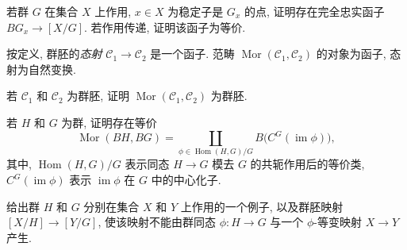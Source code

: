 \begin{exercise}[简单, 适于练习]\label{src:1.4.13}
若群 $G$ 在集合 $X$ 上作用, $x\in X$ 为稳定子是 $G_x$ 的点, 证明存在完全忠实函子 $BG_x\to[X/G]$. 若作用传递, 证明该函子为等价.
\end{exercise}
按定义, 群胚的\textit{态射} $\mathcal C_1\to\mathcal C_2$ 是一个函子. 范畴 $\operatorname{Mor}(\mathcal C_1,\mathcal C_2)$ 的对象为函子, 态射为自然变换.
\begin{exercise}[简单]\label{src:1.4.14}
若 $\mathcal C_1$ 和 $\mathcal C_2$ 为群胚, 证明 $\operatorname{Mor}(\mathcal C_1,\mathcal C_2)$ 为群胚.
\end{exercise}
\begin{exercise}[中等, 适于练习]\label{src:1.4.15}
若 $H$ 和 $G$ 为群, 证明存在等价
\[
\operatorname{Mor}(BH,BG)=
\coprod_{\phi\in\operatorname{Hom}(H,G)/G} B\bigl(C^G(\operatorname{im}\phi)\bigr),
\]
其中, $\operatorname{Hom}(H,G)/G$ 表示同态 $H\to G$ 模去 $G$ 的共轭作用后的等价类, $C^G(\operatorname{im}\phi)$ 表示 $\operatorname{im}\phi$ 在 $G$ 中的中心化子.
\end{exercise}
\begin{exercise}\label{src:1.4.16}
给出群 $H$ 和 $G$ 分别在集合 $X$ 和 $Y$ 上作用的一个例子, 以及群胚映射 $[X/H]\to[Y/G]$, 使该映射不能由群同态 $\phi:H\to G$ 与一个 $\phi$-等变映射 $X\to Y$ 产生.
\end{exercise}


